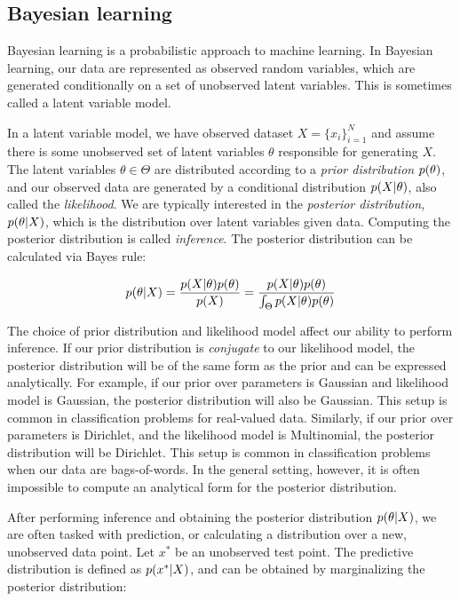 \iffalse
\subsection{Bayesian learning}
Bayesian learning is a probabilistic
approach to machine learning.
In Bayesian learning, our data
are represented as observed random variables,
which are generated conditionally
on a set of unobserved latent variables.
This is sometimes called a latent variable model.

In a latent variable model,
we have observed dataset $X = \{x_i\}_{i = 1}^N$
and assume there is some
unobserved set of latent variables $\theta$
responsible for generating $X$.
The latent variables $\theta \in \Theta$
are distributed according
to a \emph{prior distribution} $p(\theta)$,
and our observed data
are generated by a conditional
distribution $p(X | \theta)$, also called
the \emph{likelihood}.
We are typically interested in the
\emph{posterior distribution},
$p(\theta | X)$, which is the distribution
over latent variables given data.
Computing the posterior distribution is called \emph{inference}.
The posterior distribution can be calculated
via Bayes rule:

\begin{align}
  p(\theta | X) = \frac{p(X | \theta)p(\theta)}{p(X)} = \frac{p(X | \theta)p(\theta)}{\int_\Theta p(X | \theta)p(\theta)}
\end{align}

The choice of prior distribution and likelihood model
affect our ability to perform inference.
If our prior distribution is \emph{conjugate}
to our likelihood model, the posterior distribution
will be of the same form as the prior
and can be expressed analytically.
For example, if our prior over parameters
is Gaussian and likelihood model is Gaussian,
the posterior distribution will also be Gaussian.
This setup is common in classification problems
for real-valued data.
Similarly, if our prior over parameters is Dirichlet,
and the likelihood model is Multinomial,
the posterior distribution will be Dirichlet.
This setup is common in classification problems
when our data are bags-of-words.
In the general setting, however,
it is often impossible to compute an
analytical form for the posterior distribution.

After performing inference and obtaining
the posterior distribution $p(\theta | X)$,
we are often tasked with prediction,
or calculating a distribution over a new, unobserved
data point. Let $x^*$ be an unobserved test point.
The predictive distribution is defined
as $p(x^* | X)$, and can be obtained by
marginalizing the posterior distribution:

